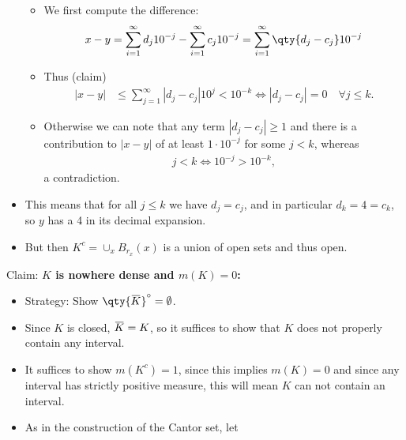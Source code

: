 \begin{solution}
\begin{itemize}
  \begin{itemize}
  \tightlist
  \item
    We first compute the difference:
    \begin{align*}  
    x - y &= \sum_{i=1}^\infty d_j 10^{-j} - \sum_{i=1}^\infty c_j 10^{-j} = \sum_{i=1}^\infty \qty{d_j - c_j} 10^{-j} \\
    \end{align*}
  \item
    Thus (claim)
    \begin{align*}
    {\left\lvert {x-y} \right\rvert} &\leq \sum_{j=1}^\infty {\left\lvert {d_j - c_j} \right\rvert} 10^j < 10^{-k} \iff {\left\lvert {d_j - c_j} \right\rvert} = 0 \quad \forall j\leq k
    .\end{align*}
  \item
    Otherwise we can note that any term
    \({\left\lvert {d_j - c_j} \right\rvert}\geq 1\) and there is a
    contribution to \({\left\lvert {x-y} \right\rvert}\) of at least
    \(1\cdot 10^{-j}\) for some \(j < k\), whereas
    \begin{align*}  
    j < k \iff 10^{-j} > 10^{-k}
    ,\end{align*}
    a contradiction.
  \end{itemize}
\item
  This means that for all \(j \leq k\) we have \(d_j = c_j\), and in
  particular \(d_k = 4 = c_k\), so \(y\) has a 4 in its decimal
  expansion.
\item
  But then \(K^c = \cup_x B_{r_x}(x)\) is a union of open sets and thus
  open.
\end{itemize}

Claim: \textbf{\(K\) is nowhere dense and \(m(K) = 0\):}

\begin{itemize}
\item
  Strategy: Show
  \(\qty{\mkern 1.5mu\overline{\mkern-1.5muK\mkern-1.5mu}\mkern 1.5mu}^\circ = \emptyset\).
\item
  Since \(K\) is closed,
  \(\mkern 1.5mu\overline{\mkern-1.5muK\mkern-1.5mu}\mkern 1.5mu = K\),
  so it suffices to show that \(K\) does not properly contain any
  interval.
\item
  It suffices to show \(m(K^c) = 1\), since this implies \(m(K) = 0\)
  and since any interval has strictly positive measure, this will mean
  \(K\) can not contain an interval.
\item
  As in the construction of the Cantor set, let


\end{itemize}
\end{solution}
